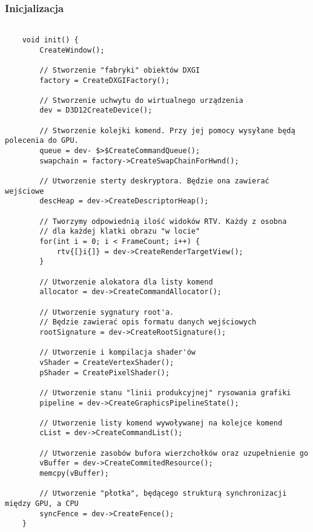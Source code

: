 \subsubsection{Inicjalizacja}
\begin{lstlisting}[caption={Pseudokod inicjalizacji Direct3D 12 (oryginalna treść)}, label={lst:d3d12_init}]
	
	void init() {
		CreateWindow();
		
		// Stworzenie "fabryki" obiektów DXGI
		factory = CreateDXGIFactory();
		
		// Stworzenie uchwytu do wirtualnego urządzenia
		dev = D3D12CreateDevice();
		
		// Stworzenie kolejki komend. Przy jej pomocy wysyłane będą polecenia do GPU.
		queue = dev- $>$CreateCommandQueue();
		swapchain = factory->CreateSwapChainForHwnd();
		
		// Utworzenie sterty deskryptora. Będzie ona zawierać wejściowe
		descHeap = dev->CreateDescriptorHeap();
		
		// Tworzymy odpowiednią ilość widoków RTV. Każdy z osobna
		// dla każdej klatki obrazu "w locie"
		for(int i = 0; i < FrameCount; i++) {
			rtv{[}i{]} = dev->CreateRenderTargetView();
		}
		
		// Utworzenie alokatora dla listy komend
		allocator = dev->CreateCommandAllocator();
	
		// Utworzenie sygnatury root'a. 
		// Będzie zawierać opis formatu danych wejściowych
		rootSignature = dev->CreateRootSignature();
		
		// Utworzenie i kompilacja shader'ów
		vShader = CreateVertexShader();
		pShader = CreatePixelShader();
		
		// Utworzenie stanu "linii produkcyjnej" rysowania grafiki
		pipeline = dev->CreateGraphicsPipelineState();
		
		// Utworzenie listy komend wywoływanej na kolejce komend
		cList = dev->CreateCommandList();
		
		// Utworzenie zasobów bufora wierzchołków oraz uzupełnienie go
		vBuffer = dev->CreateCommitedResource();	
		memcpy(vBuffer);
		
		// Utworzenie "płotka", będącego strukturą synchronizacji między GPU, a CPU
		syncFence = dev->CreateFence();
	}
	
\end{lstlisting}

